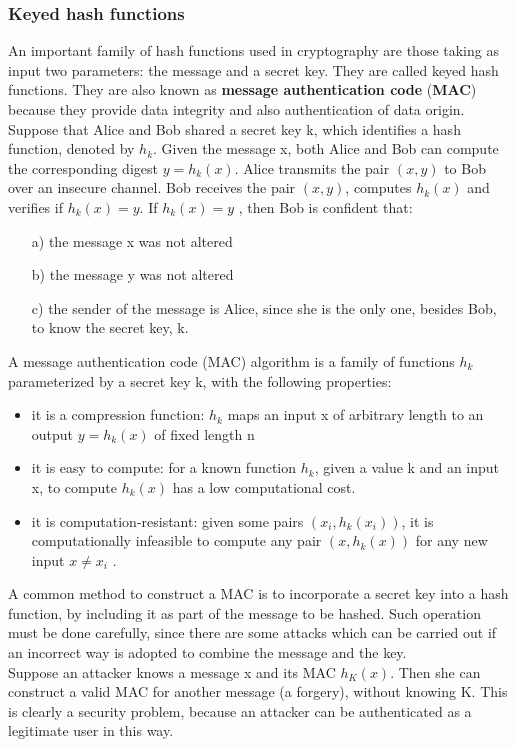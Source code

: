 \documentclass[a4paper, 10pt, titlepage]{article}
\begin{document}
\subsubsection{Keyed hash functions}
An important family of hash functions used in cryptography are those taking as input two parameters: the message and a secret key. They are called keyed hash functions.
They are also known as \textbf{message authentication code} (\textbf{MAC}) because they provide data integrity and also authentication of data origin. \\
Suppose that Alice and Bob shared a secret key k, which identifies a hash function, denoted by $h_k$.
Given the message x, both Alice and Bob can compute the corresponding digest $y = h_k(x)$.
Alice transmits the pair $(x,y)$ to Bob over an insecure channel.
Bob receives the pair $(x,y)$, computes $h_k(x)$ and verifies if $h_k(x) = y$.
If $h_k(x) = y$ , then Bob is confident that:
\begin{itemize}
\item[a)] the message x was not altered
\item[b)] the message y was not altered
\item[c)] the sender of the message is Alice, since she is the only one, besides Bob, to know the secret key, k.
\end{itemize}
A message authentication code (MAC) algorithm is a family of functions $h_k$ parameterized by a secret key k, with the following
properties:
\begin{itemize}
\item  it is a compression function: $h_k$ maps an input x of arbitrary length to an output $y = h_k(x)$ of fixed length n
\item it is easy to compute: for a known function $h_k$, given a value k and an input x, to compute $h_k(x)$ has a low computational cost.
\item it is computation-resistant: given some pairs $(x_i, h_k(x_i))$, it is computationally infeasible to compute any pair $(x, h_k(x))$ for any new input $x \neq x_i$ .
\end{itemize}
A common method to construct a MAC is to incorporate a secret key into a hash function, by including it as part of the message to be hashed. Such operation must be done carefully, since there are some attacks which can be carried out if an incorrect way is adopted to combine the message and the key. \medskip \\
Suppose an attacker knows a message x and its MAC $h_K(x)$.
Then she can construct a valid MAC for another message (a
forgery), without knowing K. This is clearly a security problem, because an attacker can be authenticated as a legitimate user in this way.
\end{document}
